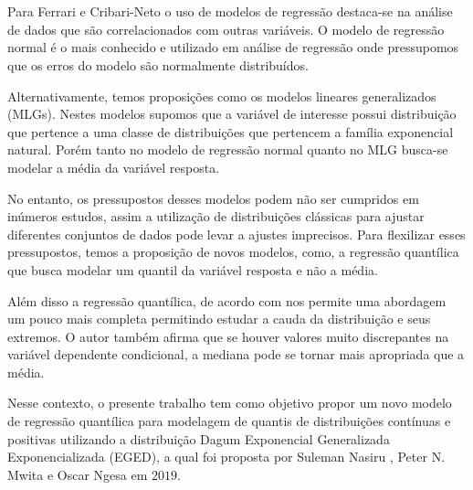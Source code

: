 \documentclass{sciposter}
\begin{document}
\section*{\hspace{2cm}\vspace{0.0cm}}
\begin{multicols}{3}{

\setlength{\parindent}{0.5em}

\section*{}
\vspace{0.2cm}

Para Ferrari e Cribari-Neto \cite{Ferrari2004} o uso de modelos de regressão destaca-se na análise de dados que são correlacionados com outras variáveis. O modelo de regressão normal é o mais conhecido e utilizado em análise de regressão onde pressupomos que os erros do modelo são normalmente distribuídos. 

Alternativamente, temos proposições como os modelos lineares generalizados (MLGs). Nestes modelos supomos que a variável de interesse possui distribuição que pertence a uma classe de distribuições que pertencem a família exponencial natural. Porém tanto no modelo de regressão normal quanto no MLG busca-se modelar a média da variável resposta. 

No entanto, os pressupostos desses modelos podem não ser cumpridos em inúmeros estudos, assim a utilização de distribuições clássicas para ajustar diferentes conjuntos de dados pode levar a ajustes imprecisos. Para flexilizar esses pressupostos, temos a proposição de novos modelos, como, a regressão quantílica que busca modelar um quantil da variável resposta e não a média. 

Além disso a regressão quantílica, de acordo com \cite{mazucheli2020} nos permite uma abordagem um pouco mais completa permitindo estudar a cauda da distribuição e seus extremos. O autor também afirma que se houver valores muito discrepantes na variável dependente condicional, a mediana pode se tornar mais apropriada que a média. 

Nesse contexto, o presente trabalho tem como objetivo propor um novo modelo de regressão quantílica para modelagem de quantis de distribuições contínuas e positivas utilizando a distribuição Dagum Exponencial Generalizada Exponencializada (EGED), a qual foi proposta por Suleman Nasiru \cite{nasiru2019exponentiated}, Peter N. Mwita e Oscar Ngesa em $2019$. 

}
\end{multicols}
\end{document}
